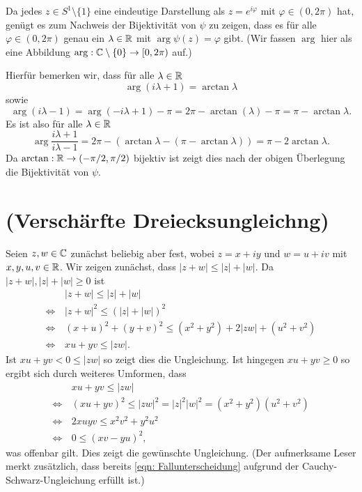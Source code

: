 \documentclass[a4paper,10pt]{article}
\begin{document}
Da jedes $z \in S^1 \setminus \{1\}$ eine eindeutige Darstellung als $z = e^{i\varphi}$ mit $\varphi \in (0,2\pi)$ hat, genügt es zum Nachweis der Bijektivität von $\psi$ zu zeigen, dass es für alle $\varphi \in (0,2\pi)$ genau ein $\lambda \in \mathbb{R}$ mit $\arg \psi(z) = \varphi$ gibt. (Wir fassen $\arg$ hier als eine Abbildung $\arg : \mathbb{C} \setminus \{0\} \to [0,2\pi)$ auf.)

Hierfür bemerken wir, dass für alle $\lambda \in \mathbb{R}$
\[
 \arg (i \lambda + 1) = \arctan \lambda
\]
sowie
\[
 \arg (i \lambda - 1) = \arg(-i \lambda + 1) - \pi = 2 \pi - \arctan (\lambda) - \pi = \pi - \arctan \lambda.
\]
Es ist also für alle $\lambda \in \mathbb{R}$
\[
 \arg \frac{i\lambda+1}{i\lambda-1}
 = 2\pi - \left( \arctan \lambda - (\pi - \arctan \lambda) \right)
 = \pi - 2\arctan \lambda.
\]
Da $\arctan : \mathbb{R} \to (-\pi/2,\pi/2)$ bijektiv ist zeigt dies nach der obigen Überlegung die Bijektivität von $\psi$.





\section{(Verschärfte Dreiecksungleichng)}
Seien $z, w \in \mathbb{C}$ zunächst beliebig aber fest, wobei $z = x+iy$ und $w = u+iv$ mit $x,y,u,v \in \mathbb{R}$. Wir zeigen zunächst, dass $|z+w| \leq |z|+|w|$. Da $|z+w|, |z|+|w| \geq 0$ ist
\begin{align*}
                &\, |z+w| \leq |z|+|w| \\
 \Leftrightarrow&\, |z+w|^2 \leq (|z|+|w|)^2 \\
 \Leftrightarrow&\, (x+u)^2 + (y+v)^2 \leq (x^2+y^2) + 2|zw| + (u^2+v^2) \\
 \Leftrightarrow&\, xu+yv \leq |zw|. \tag{1} \label{eqn: Fallunterscheidung}
\end{align*}
Ist $xu+yv < 0 \leq |zw|$ so zeigt dies die Ungleichung. Ist hingegen $xu+yv \geq 0$ so ergibt sich durch weiteres Umformen, dass
\begin{align*}
                &\, xu + yv \leq |zw| \\
 \Leftrightarrow&\, (xu+yv)^2 \leq |zw|^2 = |z|^2 |w|^2 = (x^2+y^2)(u^2+v^2) \\
 \Leftrightarrow&\, 2xuyv \leq x^2v^2 + y^2u^2 \\
 \Leftrightarrow&\, 0 \leq (xv-yu)^2, \tag{2} \label{eqn: Determinante}
\end{align*}
was offenbar gilt. Dies zeigt die gewünschte Ungleichung. (Der aufmerksame Leser merkt zusätzlich, dass bereits \eqref{eqn: Fallunterscheidung} aufgrund der Cauchy-Schwarz-Ungleichung erfüllt ist.)
\end{document}
